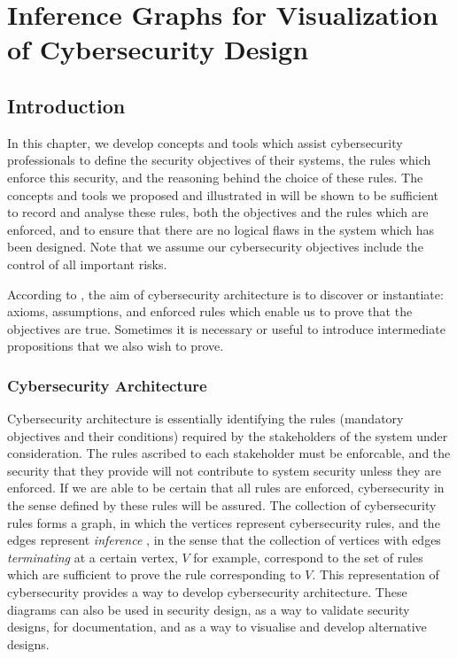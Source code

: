 \chapter{Inference Graphs for Visualization of Cybersecurity Design}


\section{Introduction}\label{introsec} \thispagestyle{empty}

In this chapter, we develop concepts and tools which assist cybersecurity professionals to define the security objectives of their systems, the rules which enforce this security, and the reasoning
behind the choice of these rules. The concepts and tools we proposed and illustrated in \cite{sheniar2019Graph} will be shown to be sufficient to record and analyse these rules, both the objectives and the rules which are enforced, and to ensure that there are no logical flaws in the system which has been designed. Note that we assume our cybersecurity objectives include the control of all important risks. 

According to \cite{sheniar2019Graph}, the aim of cybersecurity architecture is to discover or instantiate: axioms, assumptions, and enforced rules which enable us to prove that the objectives are true. Sometimes it is necessary  or useful to introduce intermediate propositions that we also wish to prove.
\subsection{Cybersecurity Architecture}\label{cybarcht}
Cybersecurity architecture is essentially identifying the rules (mandatory objectives and their conditions) required by the stakeholders of the system under consideration.
The rules ascribed to each stakeholder must be enforcable, and the security that they
provide will not contribute to system security unless they are enforced. If we 
are able to be certain that all rules are enforced, cybersecurity in the sense
defined by these rules will be assured. The collection of cybersecurity rules forms a graph, in which the vertices represent cybersecurity rules, and the edges represent {\em inference} \cite{sheniar2019Graph}, in the sense that the collection of vertices with edges {\em terminating} at a certain vertex, $V$ for example, correspond to the set of rules which are sufficient to prove the rule corresponding to $V$. This representation of cybersecurity provides a way to develop cybersecurity architecture. These diagrams can also be used in security design, as a way to validate security designs, for documentation, and as a way to visualise and develop alternative designs.

